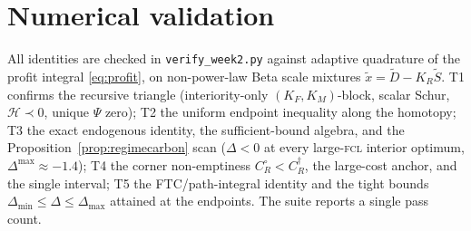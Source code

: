 \documentclass[11pt,reqno]{amsart}
\theoremstyle{plain}
\theoremstyle{definition}
\theoremstyle{remark}
\newcommand{\KR}{K_R}
\newcommand{\KF}{K_F}
\newcommand{\KM}{K_M}
\newcommand{\CR}{C_R}
\newcommand{\Hcal}{\mathcal H}
\begin{document}
\section{Numerical validation}\label{sec:num}

All identities are checked in \texttt{verify\_week2.py} against adaptive
quadrature of the profit integral \eqref{eq:profit}, on non-power-law Beta scale
mixtures $\tilde x=\tilde D-\KR\tilde S$. T1 confirms the recursive triangle
(interiority-only $(\KF,\KM)$-block, scalar Schur, $\Hcal\prec0$, unique $\Psi$
zero); T2 the uniform endpoint inequality along the homotopy; T3 the exact
endogenous identity, the sufficient-bound algebra, and the
Proposition~\ref{prop:regimecarbon} scan ($\Delta<0$ at every large-\textsc{fcl}
interior optimum, $\Delta^{\max}\approx-1.4$); T4 the corner non-emptiness
$\CR^{\circ}<\CR^{\dagger}$, the large-cost anchor, and the single interval; T5
the FTC/path-integral identity and the tight bounds $\Delta_{\min}\le\Delta\le\Delta_{\max}$
attained at the endpoints. The suite reports a single pass count.
\end{document}
